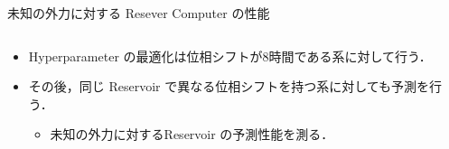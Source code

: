 \begin{frame}{未知の外力に対する Resever Computer の性能}
    \begin{columns}[T] %
        \begin{column}{.5\textwidth}
            \begin{itemize}
                \item Hyperparameter の最適化は位相シフトが$8$時間である系に対して行う．
                \item その後，同じ Reservoir で異なる位相シフトを持つ系に対しても予測を行う．\begin{itemize}
                    \item 未知の外力に対するReservoir の予測性能を測る．
                \end{itemize}
            \end{itemize}
            

\end{column}
\end{columns}
\end{frame}
